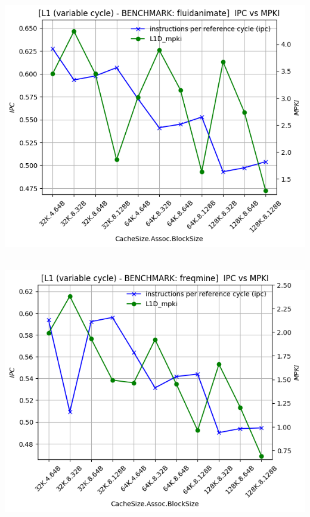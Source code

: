 \begin{minipage}{\textwidth}
    \begin{center}
        \\
        \vspace{3mm}
        \includegraphics[scale=0.65]{graphs/L1/var/fluidanimate.png}
        \vspace{6mm}
    \end{center}
\end{minipage}

\begin{minipage}{\textwidth}
    \begin{center}
        \\
        \vspace{3mm}
        \includegraphics[scale=0.65]{graphs/L1/var/freqmine.png}
        \vspace{6mm}
    \end{center}
\end{minipage}

